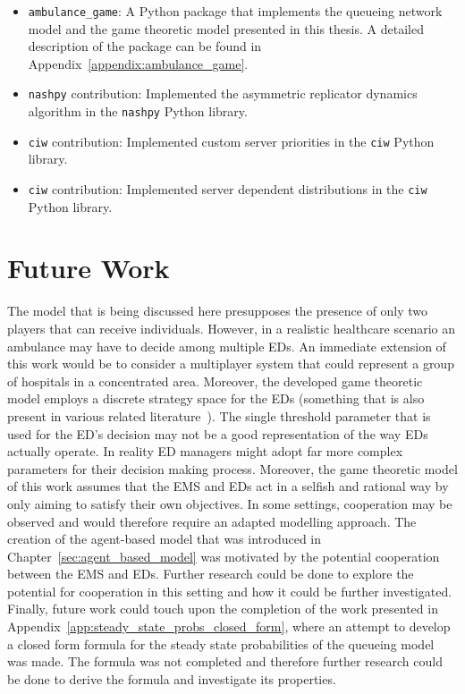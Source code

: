 \begin{itemize}
    \item \texttt{ambulance\_game}: A Python package that implements the
    queueing network model and the game theoretic model presented in this
    thesis.
    A detailed description of the package can be found in
    Appendix~\ref{appendix:ambulance_game}.
    \item \texttt{nashpy} contribution: Implemented the asymmetric replicator
    dynamics algorithm in the \texttt{nashpy} Python library.
    \item \texttt{ciw} contribution: Implemented custom server priorities in
    the \texttt{ciw} Python library.
    \item \texttt{ciw} contribution: Implemented server dependent distributions
    in the \texttt{ciw} Python library.
\end{itemize}




\section{Future Work}

The model that is being discussed here presupposes the presence of only two
players that can receive individuals.
However, in a realistic healthcare scenario an ambulance may have to decide
among multiple EDs.
An immediate extension of this work would be to consider a multiplayer system
that could represent a group of hospitals in a concentrated area.
Moreover, the developed game theoretic model employs a discrete strategy space
for the EDs (something that is also present in various related
literature~\cite{deo2011centralized,knight_measuring_poa}).
The single threshold parameter that is used for the ED's decision may not be
a good representation of the way EDs actually operate.
In reality ED managers might adopt far more complex parameters for their
decision making process.
Moreover, the game theoretic model of this work assumes that the EMS and EDs
act in a selfish and rational way by only aiming to satisfy their own
objectives.
In some settings, cooperation may be observed and would therefore require
an adapted modelling approach.
The creation of the agent-based model that was introduced in
Chapter~\ref{sec:agent_based_model} was motivated by the potential cooperation
between the EMS and EDs.
Further research could be done to explore the potential for cooperation in
this setting and how it could be further investigated.
Finally, future work could touch upon the completion of the work presented in
Appendix~\ref{app:steady_state_probs_closed_form}, where an attempt to develop
a closed
form formula for the steady state probabilities of the queueing model was
made.
The formula was not completed and therefore further research could be done to
derive the formula and investigate its properties.
